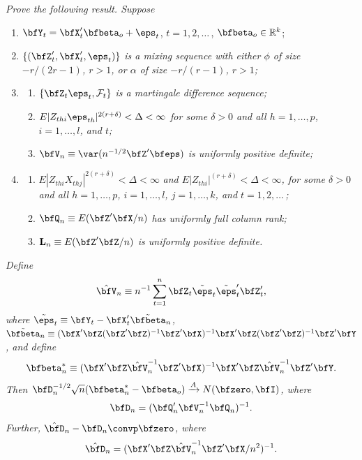 \begin{exercises}
\item\label{ex:6.8} \textit{Prove the following result. Suppose}
\begin{enumerate}[label=(\roman*)]
  \item $\bfY_t = \bfX_t'\bfbeta_o + \eps_t$, \quad $t = 1,2,\ldots$\,, \quad $\bfbeta_o \in \mathbb{R}^k$;
  \item $\{(\bfZ_t',\bfX_t',\eps_t)\}$ \textit{is a mixing sequence with either $\phi$ of size $-r/(2r-1)$, $r>1$, or $\alpha$ of size $-r/(r-1)$, $r>1$;}
  \item\begin{enumerate}[label=(\alph*)]
    \item $\{\bfZ_t\eps_t,\mathcal{F}_t\}$ \textit{is a martingale difference sequence;}
    \item $E|Z_{thi}\eps_{th}|^{2(r+\delta)} < \Delta < \infty$ \textit{for some $\delta > 0$ and all $h = 1,\ldots,p$, $i = 1,\ldots,l$, and $t$;}
    \item $\bfV_n \equiv \var(n^{-1/2}\bfZ'\bfeps)$ \textit{is uniformly positive definite;}
  \end{enumerate}
  \item\begin{enumerate}[label=(\alph*)]
    \item $E|Z_{thi}X_{thj}|^{2(r+\delta)} < \Delta < \infty$ \textit{and $E|Z_{thi}|^{(r+\delta)} < \Delta < \infty$, for some $\delta > 0$ and all $h = 1,\ldots,p$, $i = 1,\ldots,l$, $j = 1,\ldots,k$, and $t = 1,2,\ldots$\,;}
    \item $\bfQ_n \equiv E(\bfZ'\bfX/n)$ \textit{has uniformly full column rank;}
    \item $\mathbf{L}_n \equiv E(\bfZ'\bfZ/n)$ \textit{is uniformly positive definite.}
  \end{enumerate}
\end{enumerate}
\textit{Define}
\[
  \hat{\bfV}_n \equiv n^{-1}\sum_{t=1}^{n}\bfZ_t\tilde{\eps}_t\tilde{\eps}_t'\bfZ_t',
\]
\textit{where $\tilde{\eps}_t \equiv \bfY_t - \bfX_t'\tilde{\bfbeta}_n$, $\tilde{\bfbeta}_n \equiv (\bfX'\bfZ(\bfZ'\bfZ)^{-1}\bfZ'\bfX)^{-1}\bfX'\bfZ(\bfZ'\bfZ)^{-1}\bfZ'\bfY$, and define}
\[
  \bfbeta_n^* \equiv (\bfX'\bfZ\hat{\bfV}_n^{-1}\bfZ'\bfX)^{-1}\bfX'\bfZ\hat{\bfV}_n^{-1}\bfZ'\bfY.
\]
\textit{Then $\bfD_n^{-1/2}\sqrt{n}(\bfbeta_n^* - \bfbeta_o) \xrightarrow{A} N(\bfzero,\bfI)$, where}
\[
  \bfD_n = (\bfQ_n'\bfV_n^{-1}\bfQ_n)^{-1}.
\]
\textit{Further, $\hat{\bfD}_n - \bfD_n \convp \bfzero$, where}
\[
  \hat{\bfD}_n = (\bfX'\bfZ\hat{\bfV}_n^{-1}\bfZ'\bfX/n^2)^{-1}.
\]
\end{exercises}

